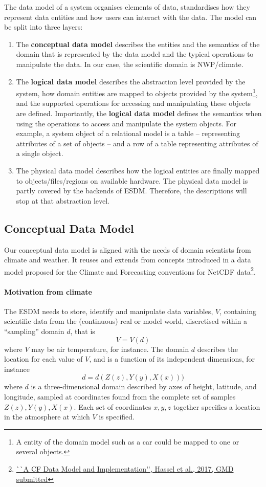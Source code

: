 The data model of a system organises elements of data, standardises how they represent data entities and how users can interact with the data.
The model can be split into three layers:
\begin{enumerate}
	\item The \textbf{conceptual data model} describes the entities and the semantics of the domain that is represented by the data model and the typical operations to manipulate the data.
	In our case, the scientific domain is NWP/climate.
	\item The \textbf{logical data model} describes the abstraction level provided by the system, how domain entities are mapped to objects provided by the system\footnote{A entity of the domain model such as a car could be mapped to one or several objects.}, and the supported operations for accessing and manipulating these objects are defined.
	Importantly, the \textbf{logical data model} defines the semantics when using the operations to access and manipulate the system objects.
	For example, a system object of a relational model is a table -- representing attributes of a set of objects -- and a row of a table representing attributes of a single object.
	\item The physical data model describes how the logical entities are finally mapped to objects/files/regions on available hardware.
	The physical data model is partly covered by the backends of ESDM. Therefore, the descriptions will stop at that abstraction level.
\end{enumerate}

\subsection{Conceptual Data Model}
\label{subsec: conceptual data model}

Our conceptual data model is aligned with the needs of domain scientists from climate and weather. It reuses and extends from concepts introduced in a data model proposed for the Climate and Forecasting conventions for NetCDF data\footnote {\url{``A CF Data Model and Implementation'', Hassel et al., 2017, GMD submitted}}.

\paragraph{Motivation from climate}



The ESDM needs to store, identify and manipulate data variables,  $V$, containing scientific data from the (continuous) real or model world, discretised within a ``sampling'' domain $d$, that is
\[V=V(d)\] where $V$ may be air temperature, for instance. The domain $d$ describes the location for each value of $V$, and is a function of its independent dimensions, for instance
\[d = d(Z(z), Y(y), X(x)))\]
where $d$ is a three-dimensional domain described by axes of height, latitude, and longitude, sampled at coordinates found from the complete set of samples $Z(z), Y(y), X(x)$.
Each set of coordinates $x,y,z$  together specifies a location in the atmosphere at which $V$ is specified.



